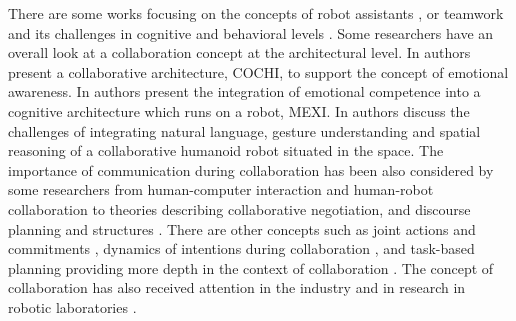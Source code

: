 \documentclass[11pt]{article}
\begin{document}
There are some works focusing on the concepts of robot assistants
\cite{clancey:agent-assistants-collaboration}, or teamwork and its challenges in
cognitive and behavioral levels \cite{nikolaidis:collaboration-joint-action,
scerri:prototype-distributed-teams}. Some researchers
have an overall look at a collaboration concept at the architectural level. In
\cite{garcia:collaboration-emotional-awareness} authors present a collaborative
architecture, COCHI, to support the concept of emotional awareness. In
\cite{esau:integrating-emotion-collaboration} authors present the integration of
emotional competence into a cognitive architecture which runs on a robot, MEXI.
In \cite{sofge:collaboration-humanoid-space} authors discuss the challenges of
integrating natural language, gesture understanding and spatial reasoning of a
collaborative humanoid robot situated in the space. The importance of
communication during collaboration has been also considered by some researchers
from human-computer interaction and human-robot collaboration
\cite{clair:action-intention-collaboraiton,
matignon:verbal-nonverbal-collaboration, rich:discourse} to theories describing
collaborative negotiation, and discourse planning and structures
\cite{andriessen:disourse-planning, grosz:discourse-structure,
sidner:discourse-collaborative-negotiation}. There are other concepts such as
joint actions and commitments \cite{grosz:intention-dynamics-collaboration},
dynamics of intentions during collaboration \cite{levesque:acting-together}, and
task-based planning providing more depth in the context of collaboration
\cite{burghart:cognitive-architecture-robot, rich:cea}. The concept of
collaboration has also received attention in the industry and in research in
robotic laboratories \cite{green:collaboration-literature-review}.
\end{document}
